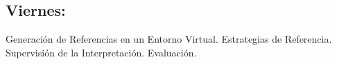 \documentclass[a4paper]{article}
\begin{document}
\subsection*{Viernes:} Generaci\'on de Referencias en un Entorno Virtual. Estrategias de Referencia. Supervisi\'on de la Interpretaci\'on. Evaluaci\'on.


\label{planning-state-search} 
\label{planning-graphplan} 
\label{planning-history} 
\label{give-challenge} 
\label{situated-REG} 
\end{document}
